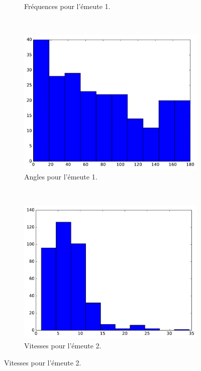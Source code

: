 \begin{figure}[!htbp]
\begin{subfigure}[t]{\subImgWclicks}
			\caption{Fréquences pour l'émeute 1.}
			\label{fig:riot_frequency}
		\end{subfigure}
		~
		\begin{subfigure}[t]{\subImgWclicks}
			\centering
			\includegraphics[width=\textwidth]{figures/ch3/riot_angle}
			\caption{Angles pour l'émeute 1.}
			\label{fig:riot_angle}
		\end{subfigure}
		~
		\begin{subfigure}[t]{\subImgWclicks}
			\centering
			\includegraphics[width=\textwidth]{figures/ch3/riot2a_filteredSpeed}
			\caption{Vitesses pour l'émeute 2.}
			\label{fig:riot2a_filteredSpeed}
		\end{subfigure}

\end{figure}
